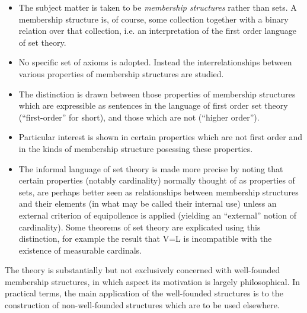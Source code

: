 \documentclass[11pt,a4paper]{article}
\begin{document}
\begin{itemize}

\item The subject matter is taken to be {\it membership structures} rather than sets.
A membership structure is, of course, some collection together with a binary relation over that collection, i.e. an interpretation of the first order language of set theory.

\item No specific set of axioms is adopted.
Instead the interrelationships between various properties of membership structures are studied.

\item The distinction is drawn between those properties of membership structures which are expressible as sentences in the language of first order set theory (``first-order'' for short), and those which are not (``higher order'').

\item Particular interest is shown in certain properties which are not first order and in the kinds of membership structure posessing these properties.

\item The informal language of set theory is made more precise by noting that certain properties (notably cardinality) normally thought of as properties of sets, are perhaps better seen as relationships between membership structures and their elements (in what may be called their internal use) unless an external criterion of equipollence is applied (yielding an ``external'' notion of cardinality).
Some theorems of set theory are explicated using this distinction, for example the result that V=L is incompatible with the existence of measurable cardinals.
\end{itemize}

The theory is substantially but not exclusively concerned with well-founded membership structures, in which aspect its motivation is largely philosophical.
In practical terms, the main application of the well-founded structures is to the construction of non-well-founded structures which are to be used elsewhere.




%
%
\end{document}
